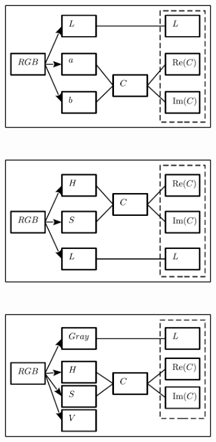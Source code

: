 \documentclass[journal]{IEEEtran}
\begin{document}
\begin{figure}[!ht] 
	\centering
	\begin{subfigure}[b]{0.15\textwidth}
		\centering
		\includegraphics[width=\textwidth]{lab_complex_color}
		\caption{}	
		\label{fig:lab_complex_color}
	\end{subfigure}
	~%
	\begin{subfigure}[b]{0.15\textwidth}
		\centering
		\includegraphics[width=\textwidth]{hsl_complex_color}
		\caption{}	
		\label{fig:hsl_complex_color}
	\end{subfigure}
	~%
	\begin{subfigure}[b]{0.15\textwidth}
		\centering
		\includegraphics[width=\textwidth]{hsv_complex_color}

\end{subfigure}
\end{figure}
\end{document}

